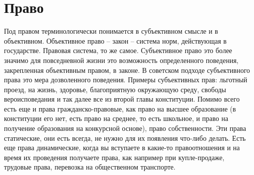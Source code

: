 \documentclass[a4paper, 12pt]{article}
\begin{document}
\section{Право}

Под правом терминологически понимается в субъективном смысле и в объективном. Объективное право -- закон -- система норм, действующая в государстве. Правовая система, то же самое. Субъективное право это более значимо для повседневной жизни это возможность определенного поведения, закрепленная объективным правом, в законе. В советском подходе субъективного права это мера дозволенного поведения. Примеры субъективных прав: льготный проезд, на жизнь, здоровье, благоприятную окружающую среду, свободы вероисповедания и так далее все из второй главы конституции. Помимо всего есть еще и права гражданско-правовые, как право на высшее образование (в конституции его нет, есть право на среднее, то есть школьное, и право на получение образования на конкурсной основе), право собственности. Эти права статические, они есть всегда, не нужно для их появления что-либо делать. Есть еще права динамические, когда вы вступаете в какие-то правоотношения и на время их проведения получаете права, как например при купле-продаже, трудовые права, перевозка на общественном транспорте. 
\end{document}

